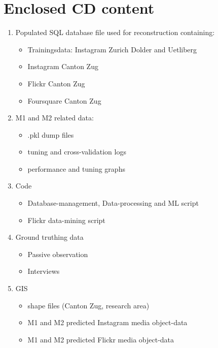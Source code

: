 \chapter*{Enclosed CD content} \label{CD_content}
\begin{enumerate}
    \item Populated SQL database file used for reconstruction containing:
    \begin{itemize}
        \item Trainingsdata: Instagram Zurich Dolder and Uetliberg
        \item Instagram Canton Zug
        \item Flickr Canton Zug
        \item Foursquare Canton Zug
    \end{itemize}
    \item M1 and M2 related data:
    \begin{itemize}
        \item .pkl dump files
        \item tuning and cross-validation logs
        \item performance and tuning graphs
    \end{itemize}
    \item Code
    \begin{itemize}
        \item Database-management, Data-processing and ML script
        \item Flickr data-mining script
    \end{itemize}
    \item Ground truthing data
    \begin{itemize}
        \item Passive observation
        \item Interviews
    \end{itemize}
    \item GIS
    \begin{itemize}
        \item shape files (Canton Zug, research area)
        \item M1 and M2 predicted Instagram media object-data
        \item M1 and M2 predicted Flickr media object-data
    \end{itemize}
\end{enumerate}